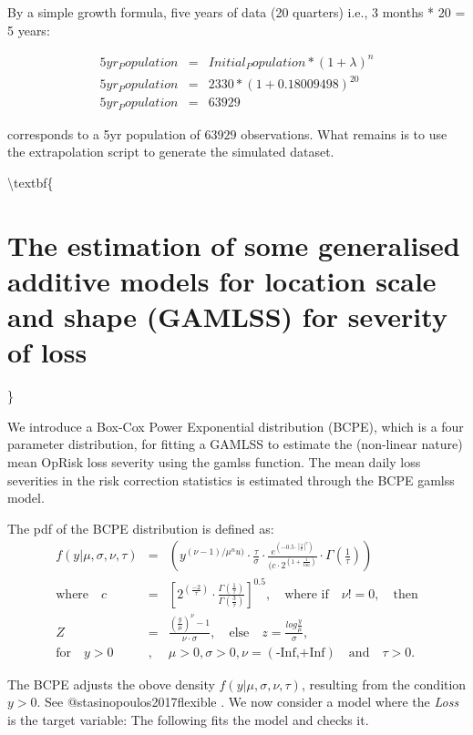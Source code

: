 \documentclass[]{article}
\begin{document}
By a simple growth formula, five years of data (20 quarters) i.e., 3
months * 20 = 5 years:

\singlespacing

\begin{eqnarray}
5yr_Population &=& Initial_Population * (1 + \lambda)^n \nonumber \\
5yr_Population &=& 2330*(1+0.18009498)^20 \nonumber \\
5yr_Population &=& 63929
\end{eqnarray} \doublespacing

corresponds to a 5yr population of \(63929\) observations. What remains
is to use the extrapolation script to generate the simulated dataset.

\textbackslash{}textbf\{

\section{The estimation of some  generalised additive models for location scale and shape (GAMLSS) for severity of loss}

\}
\label{sec:The estimation of some  generalised additive models for location scale and shape (GAMLSS) for severity of loss}

We introduce a Box-Cox Power Exponential distribution (BCPE), which is a
four parameter distribution, for fitting a GAMLSS to estimate the
(non-linear nature) mean OpRisk loss severity using the gamlss function.
The mean daily loss severities in the risk correction statistics is
estimated through the BCPE gamlss model.\medskip

The pdf of the BCPE distribution is defined as: \singlespacing
\begin{eqnarray}
f(y|\mu,\sigma,\nu,\tau)&=&(y^{(\nu-1)/\mu^nu)}\cdot{\frac{\tau}{\sigma}}\cdot \frac{e^(-0.5\cdot|\frac{z}{c}|^\tau)}{(c\cdot 2^(1+\frac{1}{tau})}\cdot \Gamma(\frac{1}{\tau}))\nonumber\\
\mbox{where} \quad c&=&[2^(\frac{-2}{\tau})\cdot\frac{\Gamma(\frac{1}{\tau})}{\Gamma(\frac{3}{\tau})}]^{0.5},\quad \mbox{where if}\quad \nu!=0, \quad \mbox{then} \nonumber\\
Z&=&\frac{(\frac{y}{\mu})^\nu-1}{\nu\cdot \sigma},\quad \mbox{else} \quad z=\frac{log\frac{y}{\mu}}{\sigma},\nonumber\\
\mbox{for} \quad y>0 &,& \mu>0, \sigma>0, \nu=(\mbox{-Inf,+Inf})\quad \mbox{and}\quad \tau>0.
\end{eqnarray} \doublespacing

The BCPE adjusts the obove density \(f(y|\mu,\sigma,\nu,\tau)\),
resulting from the condition \(y>0\). See @stasinopoulos2017flexible .
We now consider a model where the \emph{Loss} is the target variable:
The following fits the model and checks it.\medskip

\singlespacing
\end{document}
